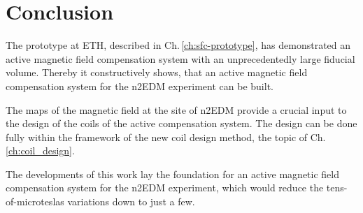 \section{Conclusion}
The prototype at ETH, described in Ch.\,\ref{ch:sfc-prototype}, has demonstrated an active magnetic field compensation system with an unprecedentedly large fiducial volume. Thereby it constructively shows, that an active magnetic field compensation system for the n2EDM experiment can be built.

The maps of the magnetic field at the site of n2EDM provide a crucial input to the design of the coils of the active compensation system. The design can be done fully within the framework of the new coil design method, the topic of Ch.\,\ref{ch:coil_design}.

The developments of this work lay the foundation for an active magnetic field compensation system for the n2EDM experiment, which would reduce the tens-of-microteslas variations down to just a few.
